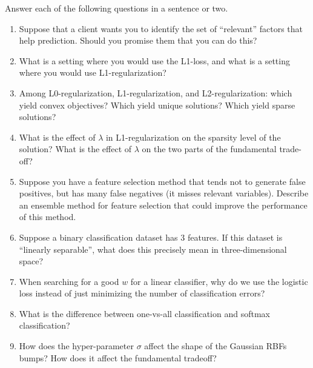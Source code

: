 \documentclass{article}
\newcommand{\blu}[1]{{\textcolor{blu}{#1}}}
\let\ask\blu
\begin{document}
\ask{Answer each of the following questions in a sentence or two.}
\begin{enumerate}

\item Suppose that a client wants you to identify the set of
``relevant'' factors that help prediction. Should you promise them that
you can do this?

\item What is a setting where you would use the L1-loss, and what is a setting where you would use L1-regularization?

\item Among L0-regularization, L1-regularization, and L2-regularization: which yield convex objectives? Which yield unique solutions? Which yield sparse solutions?

\item What is the effect of $\lambda$ in L1-regularization on the sparsity level of the solution? What is the effect of $\lambda$ on the two parts of the fundamental trade-off?

\item Suppose you have a feature selection method that tends not to generate false positives, but has many false negatives (it misses relevant variables). Describe an ensemble method for feature selection that could improve the performance of this method.

\item Suppose a binary classification dataset has 3 features. If this dataset is ``linearly separable'', what does this precisely mean in three-dimensional space?

\item When searching for a good $w$ for a linear classifier, why do we
use the logistic loss instead of just minimizing the number of
classification errors?

\item What is the difference between one-vs-all classification and softmax classification?

\item How does the hyper-parameter $\sigma$ affect the shape of the Gaussian RBFs bumps? How does it affect the fundamental tradeoff?

\end{enumerate}
\end{document}
